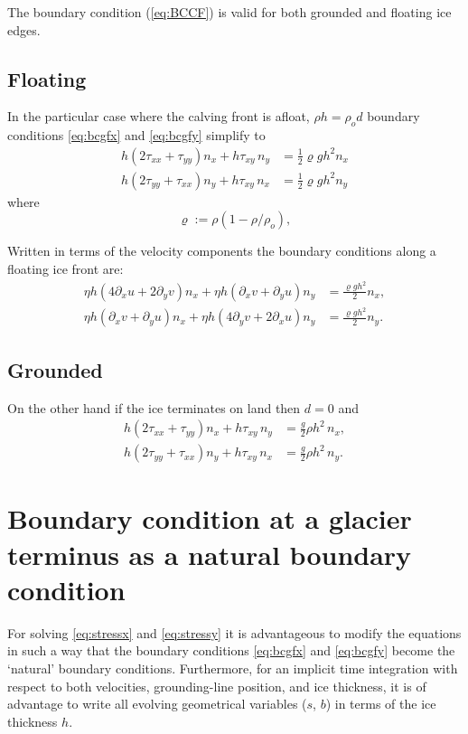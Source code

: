 \documentclass[10pt,a4paper]{book}
\newcommand{\p}{\partial}
\newcommand{\txx}{\tau_{xx}}
\newcommand{\tyy}{\tau_{yy}}
\newcommand{\txy}{\tau_{xy}}
\begin{document}
The boundary condition (\ref{eq:BCCF}) is valid for both grounded and floating ice edges.



\subsection{Floating} 
In the particular case where the calving front is afloat, $\rho h
=\rho_o d$ boundary conditions \eqref{eq:bcgfx} and
\eqref{eq:bcgfy} simplify to
\begin{align}
h (2 \txx + \tyy) n_x + h \txy \,n_y &= \frac{1}{2} \varrho g h^2   n_x \label{eq:bgfxfloat} \\
h (2 \tyy + \txx) n_y + h \txy \,n_x &= \frac{1}{2} \varrho g h^2   n_y \label{eq:bgfyfloat} 
\end{align}
where
\[
\varrho:=\rho (1-\rho/\rho_o) ,
\]

Written in terms of the velocity components the boundary conditions along a floating ice front are:
\begin{align}
  \eta h (4 \p_x u + 2  \p_y v) n_x + \eta h (\p_x v +\p_y u) n_y &= \frac{\varrho g h^2 }{2}  n_x,\\
\eta h (\p_x v + \p_y u) n_x + \eta h ( 4 \p_y v + 2 \p_x u) n_y &= \frac{\varrho g h^2 }{2}  n_y.
\end{align}

\subsection{Grounded} 
On the other hand if the ice terminates on land then $d=0$ and 
\begin{align}
h (2 \txx + \tyy) n_x + h \txy \,n_y &=  \frac{g}{2} \rho h^2 \, n_x ,\label{eq:bcgfxgrounded} \\
h (2 \tyy + \txx) n_y + h \txy \, n_x &=  \frac{g}{2} \rho h^2 \, n_y .\label{eq:bcgfygrounded} 
\end{align}

\section{Boundary condition at a glacier terminus as a natural boundary condition}

For solving \eqref{eq:stressx} and \eqref{eq:stressy} it is
advantageous to modify the equations in such a way that the boundary
conditions \eqref{eq:bcgfx} and \eqref{eq:bcgfy} become the `natural'
boundary conditions. Furthermore, for an implicit time integration
with respect to both velocities, grounding-line position, and ice
thickness, it is of advantage to write all evolving geometrical
variables ($s$, $b$) in terms of the ice thickness $h$.
\end{document}
